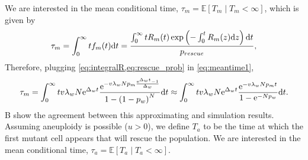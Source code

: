 \documentclass[12pt]{extarticle}
\renewcommand{\d}[1]{\ensuremath{\operatorname{d}\!{#1}}}
\renewcommand{\d}{{\rm d}}
\newcommand{\e}{{\rm e}}
\begin{document}
\begin{appendices}
We are interested in the mean conditional time, $\tau_m=\mathbb{E}\left[T_m \mid T_m<\infty\right]$, which is given by
\begin{equation}\label{eq:meantime1}
\begin{aligned}
\tau_m =
\int_{0}^{\infty}{t f_m(t) \d t} = 
\frac{\int_{0}^{\infty}{tR_m(t)\exp\left(-\int_0^{t}{R_m(z)\d z}\right) \d t}}{p_{rescue}},
\end{aligned}
\end{equation}
Therefore, plugging \cref{eq:integralR,eq:rescue_prob} in \cref{eq:meantime1}, 
\begin{align}\label{eq:limitapprox_appendix}
\tau_m = 
\int_0^\infty tv\lambda_w N\e^{\Delta_wt}\frac{\e^{-v\lambda_w N p_m\frac{\e^{\Delta_w t}-1}{\Delta_w}} }{1-\left(1-p_w\right)^N} \d t\approx
\int_{0}^{\infty} tv\lambda_w N\e^{\Delta_wt}\frac{\e^{-v\lambda_w N p_mt} }{1-\e^{-Np_w}}\d t. 
\end{align}
B show the agreement between this approximating and simulation results.
\\
Assuming aneuploidy is possible ($u>0$), we define $T_a$ to be the time at which the first mutant cell appears that will rescue the population. We are interested in the mean conditional time, $\tau_a=\mathbb{E}\left[T_a \mid T_a<\infty\right]$.


\end{appendices}
\end{document}
